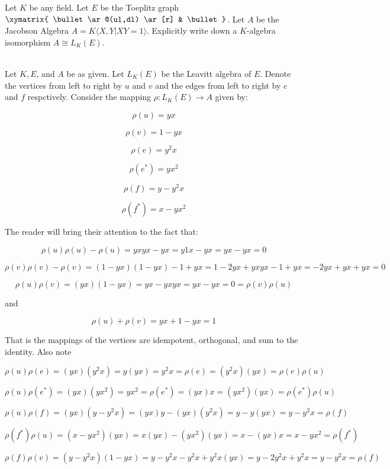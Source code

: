 Let $K$ be any field. Let $E$ be the Toeplitz graph  \ \ \
$\xymatrix{ \bullet \ar@(ul,dl)  \ar[r] & \bullet}$. Let $A$ be the Jacobson Algebra $A=K\langle X,Y|XY=1\rangle$.
Explicitly write down a $K$-algebra isomorphism $A\cong L_K(E)$.\\

\begin{solution}\renewcommand{\qedsymbol}{}\ \\
    Let $K, E$, and $A$ be as given. Let $L_K(E)$ be the Leavitt algebra of $E$. Denote the vertices
    from left to right by $u$ and $v$ and the edges from left to right by $e$ and $f$ respctively.
    Consider the mapping $\rho:L_K(E)\to A$ given by:

    $$\rho(u)=yx$$

    $$\rho(v)=1-yx$$

    $$\rho(e)=y^2x$$

    $$\rho(e^*)=yx^2$$

    $$\rho(f)=y-y^2x$$

    $$\rho(f^*)=x-yx^2$$

    The reader will bring their attention to the fact that:

    $$\rho(u)\rho(u)-\rho(u)=yxyx-yx=y1x-yx=yx-yx=0$$

    $$\rho(v)\rho(v)-\rho(v)=(1-yx)(1-yx)-1+yx=1-2yx+yxyx-1+yx=-2yx+yx+yx=0$$

    $$\rho(u)\rho(v)=(yx)(1-yx)=yx-yxyx=yx-yx=0=\rho(v)\rho(u)$$

    and

    $$\rho(u)+\rho(v)=yx+1-yx=1$$

    That is the mappings of the vertices are idempotent, orthogonal, and sum to the identity. Also note
    
    $$\rho(u)\rho(e)=(yx)(y^2x)=y(yx)=y^2x=\rho(e)=(y^2x)(yx)=\rho(e)\rho(u)$$

    $$\rho(u)\rho(e^*)=(yx)(yx^2)=yx^2=\rho(e^*)=(yx)x=(yx^2)(yx)=\rho(e^*)\rho(u)$$

    $$\rho(u)\rho(f)=(yx)(y-y^2x)=(yx)y-(yx)(y^2x)=y-y(yx)=y-y^2x=\rho(f)$$

    $$\rho(f^*)\rho(u)=(x-yx^2)(yx)=x(yx)-(yx^2)(yx)=x-(yx)x=x-yx^2=\rho(f^*)$$

    $$\rho(f)\rho(v)=(y-y^2x)(1-yx)=y-y^2x-y^2x+y^2x(yx)=y-2y^2x+y^2x=y-y^2x=\rho(f)$$


\end{solution}